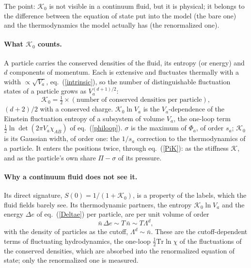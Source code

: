 \documentclass[11pt,aps,preprint,nofootinbib,superscriptaddress,tightenlines]{revtex4-2}
\def\st{\begin{equation}}
\def\stp{\end{equation}}
\def\Eq#1{eq.~(\ref{#1})}
\let\oldparagraph\paragraph
\renewcommand{\paragraph}{\par\bigskip\oldparagraph}
\begin{document}
The point: $\mathcal K_0$ is not visible in a continuum fluid, but it is physical; it belongs to the difference between the equation of state put into the
model (the bare one) and the thermodynamics the model actually has (the renormalized one).

\paragraph{What $\mathcal K_0$ counts.}  A particle carries the conserved densities of the fluid, its entropy (or energy) and $d$ components of momentum.  Each is
extensive and fluctuates thermally with a width $\propto\sqrt{V_a}$, \Eq{intrinsic}, so the number of distinguishable fluctuation states of a particle grows as
$V_a^{(d+1)/2}$:
\st
\mathcal K_0=\tfrac12\times(\text{number of conserved densities per particle}),
\stp
$(d+2)/2$ with a conserved charge.  $\mathcal K_0\ln V_a$ is the $V_a$-dependence of the Einstein fluctuation entropy of a subsystem of volume $V_a$, the one-loop term $\tfrac12\ln\det(2\pi V_a\chi_{AB})$ of \Eq{philoop}.  $\sigma$ is the maximum of
$\Phi_a$, of order $s_a$; $\mathcal K_0$ is its Gaussian width, of order one: the $1/s_a$ correction to the thermodynamics of a particle.  It enters the positions twice, through \Eq{PiK}: as the stiffness
$\mathcal K$, and as the particle's own share $\Pi-\sigma$ of its pressure.

\paragraph{Why a continuum fluid does not see it.}  Its direct signature, $S(0)=1/(1+\mathcal K_0)$, is a property of the labels, which the fluid fields barely see.
Its thermodynamic partners, the entropy $\mathcal K_0\ln V_a$ and the energy $\Delta e$ of \Eq{Deltae} per particle, are per unit volume of order
\st
\bar n\,\Delta e\sim T\,\bar n\sim T\Lambda^d ,
\stp
with the density of particles as the cutoff, $\Lambda^d\sim\bar n$.  These are the cutoff-dependent terms of fluctuating hydrodynamics, the one-loop $\tfrac12\mathrm{Tr}\ln\chi$ of
the fluctuations of the conserved densities, which are absorbed into the renormalized equation of state; only the renormalized one is measured.
\end{document}
